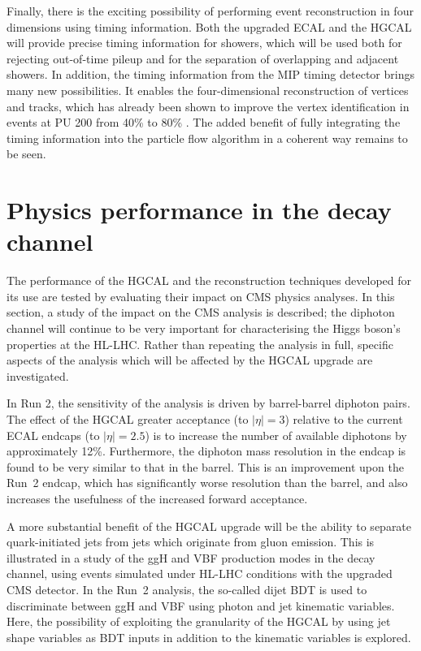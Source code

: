 Finally, there is the exciting possibility of performing event reconstruction in four dimensions using timing information.
Both the upgraded ECAL and the HGCAL will provide precise timing information for showers, 
which will be used both for rejecting out-of-time pileup and for the separation of overlapping and adjacent showers.
In addition, the timing information from the MIP timing detector brings many new possibilities. 
It enables the four-dimensional reconstruction of vertices and tracks, 
which has already been shown to improve the vertex identification in \Hgg events at PU 200 from 40\% to 80\% \cite{MTD}.
The added benefit of fully integrating the timing information into the particle flow algorithm in a coherent way remains to be seen.

\section{Physics performance in the \Hgg decay channel}
\label{sec:hgcal_physics}
The performance of the HGCAL and the reconstruction techniques developed for its use 
are tested by evaluating their impact on CMS physics analyses.
In this section, a study of the impact on the CMS \Hgg analysis is described;
the diphoton channel will continue to be very important for characterising the Higgs boson's 
properties at the HL-LHC.
Rather than repeating the analysis in full, 
specific aspects of the analysis which will be affected by the HGCAL upgrade are investigated.

In Run 2, the sensitivity of the \Hgg analysis is driven by barrel-barrel diphoton pairs.
The effect of the HGCAL greater acceptance (to $|\eta|=3$) relative to the current ECAL endcaps
(to $|\eta|=2.5$) is to increase the number of available diphotons by approximately 12\%.
Furthermore, the diphoton mass resolution in the endcap is found to be very similar 
to that in the barrel.
This is an improvement upon the Run~2 endcap, 
which has significantly worse resolution than the barrel, 
and also increases the usefulness of the increased forward acceptance.

A more substantial benefit of the HGCAL upgrade 
will be the ability to separate quark-initiated jets from jets which originate from gluon emission.
This is illustrated in a study of the ggH and VBF production modes in the \Hgg decay channel, 
using events simulated under HL-LHC conditions with the upgraded CMS detector.
In the Run~2 analysis, the so-called dijet BDT is used to discriminate between ggH and VBF
using photon and jet kinematic variables.
Here, the possibility of exploiting the granularity of the HGCAL 
by using jet shape variables as BDT inputs in addition to the kinematic variables is explored.

